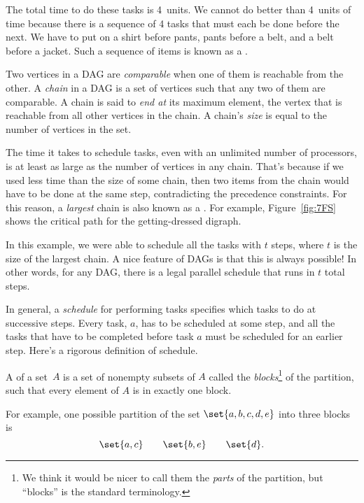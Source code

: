 The total time to do these tasks is 4~units.  We cannot do better than
4~units of time because there is a sequence of 4 tasks that must each
be done before the next.  We have to put on a shirt before pants,
pants before a belt, and a belt before a jacket.  Such a sequence of
items is known as a .

\begin{definition}
Two vertices in a DAG are \emph{comparable} when one of them is
reachable from the other.  A \emph{chain} in a DAG is a set of
vertices such that any two of them are comparable.  A chain is said to
\emph{end at} its maximum element, the vertex that
is reachable from all other vertices in the chain.  A chain's
\emph{size} is equal to the number of vertices in the set.
\end{definition}

The time it takes to schedule tasks, even with an unlimited number of
processors, is at least as large as the number of vertices in any
chain.  That's because if we used less time than the size of some
chain, then two items from the chain would have to be done at the same
step, contradicting the precedence constraints.  For this reason, a
\emph{largest} chain is also known as a .  For
example, Figure~\ref{fig:7FS} shows the critical path for the
getting-dressed digraph.

In this example, we were able to schedule all the tasks with $t$
steps, where $t$ is the size of the largest chain.  A nice feature of
DAGs is that this is always possible!  In other words, for any DAG,
there is a legal parallel schedule that runs in $t$ total steps.

In general, a \emph{schedule} for performing tasks specifies which
tasks to do at successive steps.  Every task, $a$, has to be scheduled
at some step, and all the tasks that have to be completed before task
$a$ must be scheduled for an earlier step.  Here's a rigorous
definition of schedule.

\begin{definition}\label{def:partition}
A  of a set~$A$ is a set of nonempty subsets of $A$
called the \emph{blocks}\footnote{We think it would be nicer to call
  them the \emph{parts} of the partition, but ``blocks'' is the
  standard terminology.} of the partition, such that every element of
$A$ is in exactly one block.
\end{definition}

For example, one possible partition of the set $\set{a, b, c, d, e}$
into three blocks is
\[
\set{a, c} \qquad \set{b, e} \qquad \set{d}.
\]

